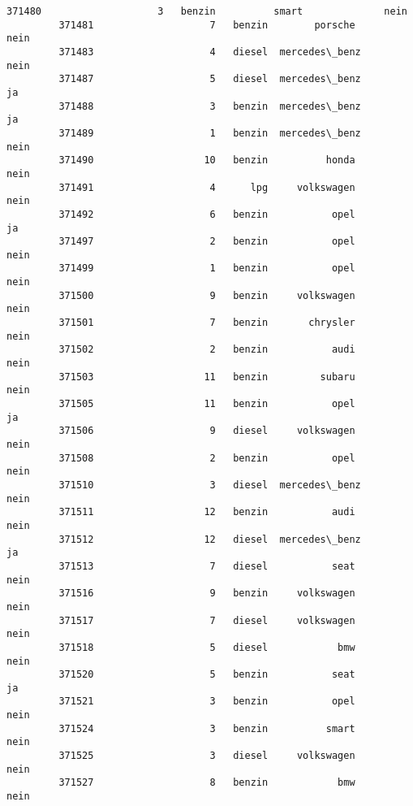 \documentclass[11pt]{article}
\begin{document}
\begin{Verbatim}[commandchars=\\\{\}]
         371480                    3   benzin          smart              nein   
         371481                    7   benzin        porsche              nein   
         371483                    4   diesel  mercedes\_benz              nein   
         371487                    5   diesel  mercedes\_benz                ja   
         371488                    3   benzin  mercedes\_benz                ja   
         371489                    1   benzin  mercedes\_benz              nein   
         371490                   10   benzin          honda              nein   
         371491                    4      lpg     volkswagen              nein   
         371492                    6   benzin           opel                ja   
         371497                    2   benzin           opel              nein   
         371499                    1   benzin           opel              nein   
         371500                    9   benzin     volkswagen              nein   
         371501                    7   benzin       chrysler              nein   
         371502                    2   benzin           audi              nein   
         371503                   11   benzin         subaru              nein   
         371505                   11   benzin           opel                ja   
         371506                    9   diesel     volkswagen              nein   
         371508                    2   benzin           opel              nein   
         371510                    3   diesel  mercedes\_benz              nein   
         371511                   12   benzin           audi              nein   
         371512                   12   diesel  mercedes\_benz                ja   
         371513                    7   diesel           seat              nein   
         371516                    9   benzin     volkswagen              nein   
         371517                    7   diesel     volkswagen              nein   
         371518                    5   diesel            bmw              nein   
         371520                    5   benzin           seat                ja   
         371521                    3   benzin           opel              nein   
         371524                    3   benzin          smart              nein   
         371525                    3   diesel     volkswagen              nein   
         371527                    8   benzin            bmw              nein   
         

\end{Verbatim}
\end{document}
